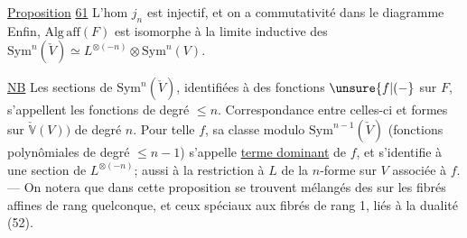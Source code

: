 \uline{Proposition} \uline{61}  L'hom $j_n$ est injectif, et on
a commutativité dans le diagramme
Enfin, $\mathrm{Alg\,aff}(F)$ est isomorphe à la limite
inductive des $\mathrm{Sym}^n(\check V)\simeq L^{\otimes(-n)}\otimes\mathrm{Sym}^n(V)$.

\uline{NB} Les sections de $\mathrm{Sym}^n(\check V)$, identifiées à des
fonctions $\unsure{f|(-}$ sur $F$, s'appellent les fonctions  de
degré $\leq n$. Correspondance entre celles-ci et
formes sur $\check{\mathbb V}(V))$ de degré $n$. Pour  telle
$f$, sa classe modulo $\mathrm{Sym}^{n-1}(\check V)$ (fonctions
polynômiales de degré $\leq n-1$) s'appelle
\uline{terme dominant} de $f$, et s'identifie
à une section de $L^{\otimes(-n)}$;   aussi à
la restriction à $L$ de la $n$-forme sur $V$ associée
à $f$. --- On notera que dans cette proposition
se trouvent mélangés des   sur les
fibrés affines de rang quelconque, et ceux
spéciaux aux fibrés de rang 1, liés à
la dualité (52).
